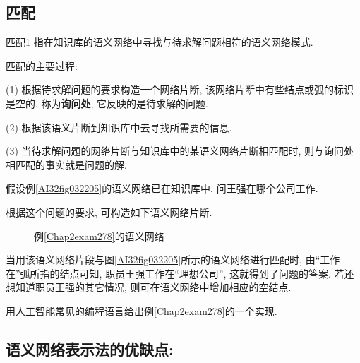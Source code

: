 \subsection{匹配}
\begin{mydef}{匹配}{1}
    指在知识库的语义网络中寻找与待求解问题相符的语义网络模式.
\end{mydef}匹配的主要过程:

    (1) 根据待求解问题的要求构造一个网络片断, 该网络片断中有些结点或弧的标识是空的, 称为\textbf{询问处}, 它反映的是待求解的问题.

    (2) 根据该语义片断到知识库中去寻找所需要的信息.

    (3) 当待求解问题的网络片断与知识库中的某语义网络片断相匹配时, 则与询问处相匹配的事实就是问题的解.
\begin{example}\label{Chap2exam278}
    假设例\ref{AI32fig032205}的语义网络已在知识库中, 问王强在哪个公司工作.
\end{example}
根据这个问题的要求, 可构造如下语义网络片断.
\begin{figure}[H]
\begin{center}
\caption{例\ref{Chap2exam278}的语义网络}
\label{AI32fig105}
\end{center}
\end{figure}
    当用该语义网络片段与图\ref{AI32fig032205}所示的语义网络进行匹配时, 由“工作在”弧所指的结点可知, 职员王强工作在“理想公司”, 这就得到了问题的答案.
若还想知道职员王强的其它情况, 则可在语义网络中增加相应的空结点.
\begin{think}
    用人工智能常见的编程语言给出例\ref{Chap2exam278}的一个实现.
\end{think}
\subsection{语义网络表示法的优缺点:}

